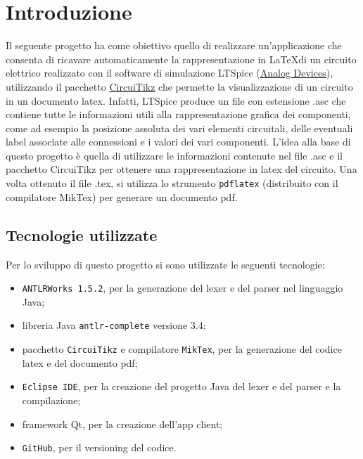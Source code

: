\section{Introduzione}

Il seguente progetto ha come obiettivo quello di realizzare un'applicazione che consenta di ricavare automaticamente la rappresentazione in \LaTeX \;di un circuito elettrico realizzato con il software di simulazione LTSpice (\href{https://www.analog.com/en/design-center/design-tools-and-calculators/ltspice-simulator.html}{Analog Devices}), utilizzando il pacchetto \href{https://it.overleaf.com/learn/latex/CircuiTikz_package}{CircuiTikz} che permette la visualizzazione di un circuito in un documento latex. Infatti, LTSpice produce un file con estensione .asc che contiene tutte le informazioni utili alla rappresentazione grafica dei componenti, come ad esempio la posizione assoluta dei vari elementi circuitali, delle eventuali label associate alle connessioni e i valori dei vari componenti. L'idea alla base di questo progetto è quella di utilizzare le informazioni contenute nel file .asc e il pacchetto CircuiTikz per ottenere una rappresentazione in latex del circuito. Una volta ottenuto il file .tex, si utilizza lo strumento \texttt{pdflatex} (distribuito con il compilatore MikTex) per generare un documento pdf.
\subsection{Tecnologie utilizzate}
Per lo sviluppo di questo progetto si sono utilizzate le seguenti tecnologie:
\begin{itemize}
	\item \texttt{ANTLRWorks 1.5.2}, per la generazione del lexer e del parser nel linguaggio Java;
	\item libreria Java \texttt{antlr-complete} versione 3.4;
	\item pacchetto \texttt{CircuiTikz} e compilatore \texttt{MikTex}, per la generazione del codice latex e del documento pdf;
	\item \texttt{Eclipse IDE}, per la creazione del progetto Java del lexer e del parser e la compilazione;
	\item framework Qt, per la creazione dell'app client;
	\item \texttt{GitHub}, per il versioning del codice.
\end{itemize}

